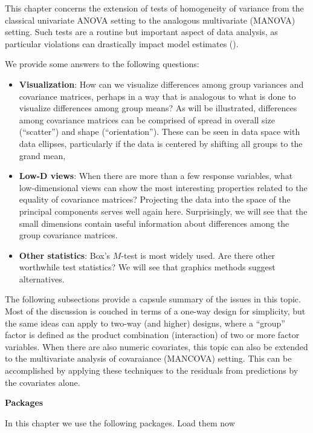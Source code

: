 \documentclass[
  letterpaper,
  10pt,
  krantz2]{krantz}
\begin{document}
{This chapter concerns the extension of tests of homogeneity of variance
from the classical univariate ANOVA setting to the analogous
multivariate (MANOVA) setting. Such tests are a routine but important
aspect of data analysis, as particular violations can drastically impact
model estimates ().

We provide some answers to the following questions:

\begin{itemize}
\item
  \textbf{Visualization}: How can we visualize differences among group
  variances and covariance matrices, perhaps in a way that is analogous
  to what is done to visualize differences among group means? As will be
  illustrated, differences among covariance matrices can be comprised of
  spread in overall size (``scatter'') and shape (``orientation'').
  These can be seen in data space with data ellipses, particularly if
  the data is centered by shifting all groups to the grand mean,
\item
  \textbf{Low-D views}: When there are more than a few response
  variables, what low-dimensional views can show the most interesting
  properties related to the equality of covariance matrices? Projecting
  the data into the space of the principal components serves well again
  here. Surprisingly, we will see that the small dimensions contain
  useful information about differences among the group covariance
  matrices.
\item
  \textbf{Other statistics}: Box's \(M\)-test is most widely used. Are
  there other worthwhile test statistics? We will see that graphics
  methods suggest alternatives.
\end{itemize}

The following subsections provide a capsule summary of the issues in
this topic. Most of the discussion is couched in terms of a one-way
design for simplicity, but the same ideas can apply to two-way (and
higher) designs, where a ``group'' factor is defined as the product
combination (interaction) of two or more factor variables. When there
are also numeric covariates, this topic can also be extended to the
multivariate analysis of covaraiance (MANCOVA) setting. This can be
accomplished by applying these techniques to the residuals from
predictions by the covariates alone.

\textbf{Packages}

In this chapter we use the following packages. Load them now

}
\end{document}
